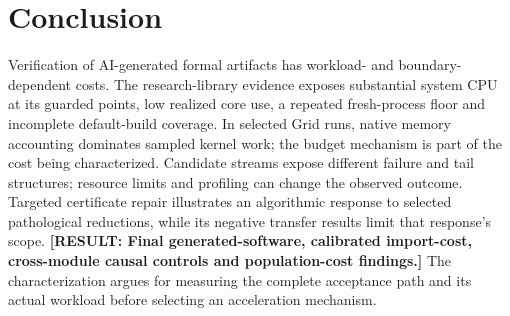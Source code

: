 \documentclass[10pt,twocolumn]{article}
\newcommand{\missing}[1]{\textbf{[RESULT: #1]}}
\begin{document}
\section{Conclusion}
Verification of AI-generated formal artifacts has workload- and
boundary-dependent costs.
The research-library evidence exposes substantial system CPU at its guarded
points, low realized core use, a repeated fresh-process floor and incomplete
default-build coverage. In selected Grid runs, native memory accounting
dominates sampled kernel work; the budget mechanism is part of the cost
being characterized. Candidate streams expose different failure and tail structures;
resource limits and profiling can change the observed outcome.
Targeted certificate repair illustrates an algorithmic response to selected
pathological reductions, while its negative transfer results limit that
response's scope.
\missing{Final generated-software, calibrated import-cost, cross-module
causal controls and population-cost findings.}
The characterization argues for measuring the complete acceptance path and
its actual workload before selecting an acceleration mechanism.



\end{document}
